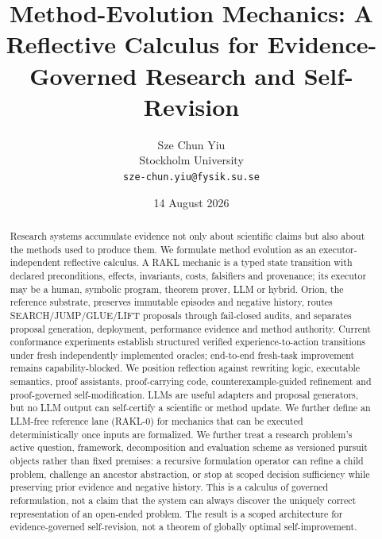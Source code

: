 \documentclass[11pt]{article}
\title{Method-Evolution Mechanics: A Reflective Calculus for Evidence-Governed Research and Self-Revision}
\author{Sze Chun Yiu\\Stockholm University\\\texttt{sze-chun.yiu@fysik.su.se}}
\date{14 August 2026}
\begin{document}
\sloppy
\maketitle

\begin{abstract}
Research systems accumulate evidence not only about scientific claims but also about the methods used to produce them. We formulate method evolution as an executor-independent reflective calculus. A RAKL mechanic is a typed state transition with declared preconditions, effects, invariants, costs, falsifiers and provenance; its executor may be a human, symbolic program, theorem prover, LLM or hybrid. Orion, the reference substrate, preserves immutable episodes and negative history, routes SEARCH/JUMP/GLUE/LIFT proposals through fail-closed audits, and separates proposal generation, deployment, performance evidence and method authority. Current conformance experiments establish structured verified experience-to-action transitions under fresh independently implemented oracles; end-to-end fresh-task improvement remains capability-blocked. We position reflection against rewriting logic, executable semantics, proof assistants, proof-carrying code, counterexample-guided refinement and proof-governed self-modification. LLMs are useful adapters and proposal generators, but no LLM output can self-certify a scientific or method update. We further define an LLM-free reference lane (RAKL-0) for mechanics that can be executed deterministically once inputs are formalized. We further treat a research problem's active question, framework, decomposition and evaluation scheme as versioned pursuit objects rather than fixed premises: a recursive formulation operator can refine a child problem, challenge an ancestor abstraction, or stop at scoped decision sufficiency while preserving prior evidence and negative history. This is a calculus of governed reformulation, not a claim that the system can always discover the uniquely correct representation of an open-ended problem. The result is a scoped architecture for evidence-governed self-revision, not a theorem of globally optimal self-improvement.
\end{abstract}















\label{sec:evaluation}







\end{document}
